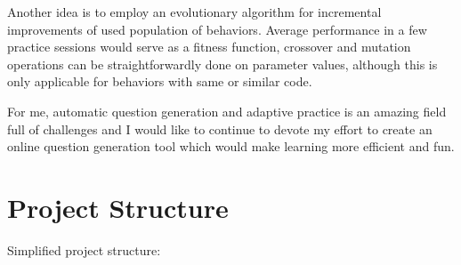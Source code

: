 \documentclass[12pt, twoside]{fithesis2}
\renewcommand{\_}{\leavevmode \kern0.07em\vbox{\hrule width0.4em}}
\begin{document}
Another idea is to employ an evolutionary algorithm for incremental improvements of used population of behaviors.
Average performance in a few practice sessions would serve as a fitness function,
crossover and mutation operations can be straightforwardly done on parameter values,
although this is only applicable for behaviors with same or similar code.

For me, automatic question generation and adaptive practice is an amazing field full of challenges
and I would like to continue to devote my effort to create an online question generation tool which would make learning more efficient and fun.




\appendix


\printbibliography

\chapter{Project Structure}
\label{chap:project-structure}

Simplified project structure:
\end{document}
